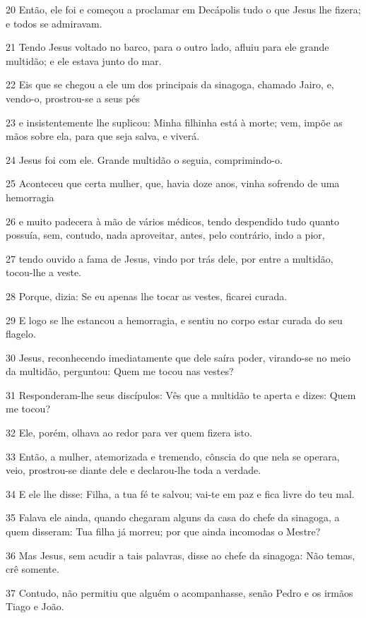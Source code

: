 \par 20 Então, ele foi e começou a proclamar em Decápolis tudo o que Jesus lhe fizera; e todos se admiravam.
\par 21 Tendo Jesus voltado no barco, para o outro lado, afluiu para ele grande multidão; e ele estava junto do mar.
\par 22 Eis que se chegou a ele um dos principais da sinagoga, chamado Jairo, e, vendo-o, prostrou-se a seus pés
\par 23 e insistentemente lhe suplicou: Minha filhinha está à morte; vem, impõe as mãos sobre ela, para que seja salva, e viverá.
\par 24 Jesus foi com ele. Grande multidão o seguia, comprimindo-o.
\par 25 Aconteceu que certa mulher, que, havia doze anos, vinha sofrendo de uma hemorragia
\par 26 e muito padecera à mão de vários médicos, tendo despendido tudo quanto possuía, sem, contudo, nada aproveitar, antes, pelo contrário, indo a pior,
\par 27 tendo ouvido a fama de Jesus, vindo por trás dele, por entre a multidão, tocou-lhe a veste.
\par 28 Porque, dizia: Se eu apenas lhe tocar as vestes, ficarei curada.
\par 29 E logo se lhe estancou a hemorragia, e sentiu no corpo estar curada do seu flagelo.
\par 30 Jesus, reconhecendo imediatamente que dele saíra poder, virando-se no meio da multidão, perguntou: Quem me tocou nas vestes?
\par 31 Responderam-lhe seus discípulos: Vês que a multidão te aperta e dizes: Quem me tocou?
\par 32 Ele, porém, olhava ao redor para ver quem fizera isto.
\par 33 Então, a mulher, atemorizada e tremendo, cônscia do que nela se operara, veio, prostrou-se diante dele e declarou-lhe toda a verdade.
\par 34 E ele lhe disse: Filha, a tua fé te salvou; vai-te em paz e fica livre do teu mal.
\par 35 Falava ele ainda, quando chegaram alguns da casa do chefe da sinagoga, a quem disseram: Tua filha já morreu; por que ainda incomodas o Mestre?
\par 36 Mas Jesus, sem acudir a tais palavras, disse ao chefe da sinagoga: Não temas, crê somente.
\par 37 Contudo, não permitiu que alguém o acompanhasse, senão Pedro e os irmãos Tiago e João.

